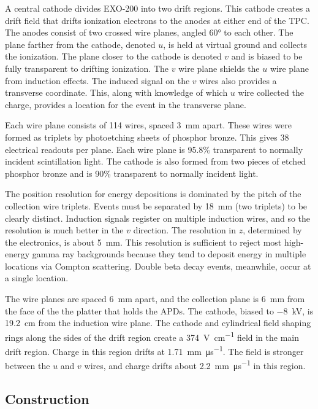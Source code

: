 \documentclass[herrin-thesis.tex]{subfiles}
\begin{document}
A central cathode divides EXO-200 into two drift regions. This cathode creates a drift field that drifts ionization electrons to the anodes at either end of the TPC. The anodes consist of two crossed wire planes, angled \ang{60} to each other. The plane farther from the cathode, denoted \(u\), is held at virtual ground and collects the ionization. The plane closer to the cathode is denoted \(v\) and is biased to be fully transparent to drifting ionization. The \(v\) wire plane shields the \(u\) wire plane from induction effects. The induced signal on the \(v\) wires also provides a transverse coordinate. This, along with knowledge of which \(u\) wire collected the charge, provides a location for the event in the transverse plane.

Each wire plane consists of 114 wires, spaced \SI{3}{\mm} apart. These wires were formed as triplets by photoetching sheets of phosphor bronze. This gives 38 electrical readouts per plane. Each wire plane is 95.8\% transparent to normally incident scintillation light. The cathode is also formed from two pieces of etched phosphor bronze and is 90\% transparent to normally incident light.

The position resolution for energy depositions is dominated by the pitch of the collection wire triplets. Events must be separated by \SI{18}{\mm} (two triplets) to be clearly distinct. Induction signals register on multiple induction wires, and so the resolution is much better in the \(v\) direction. The resolution in \(z\), determined by the electronics, is about \SI{5}{\mm}. This resolution is sufficient to reject most high-energy gamma ray backgrounds because they tend to deposit energy in multiple locations via Compton scattering. Double beta decay events, meanwhile, occur at a single location.

The wire planes are spaced \SI{6}{\mm} apart, and the collection plane is \SI{6}{\mm} from the face of the the platter that holds the APDs. The cathode, biased to \SI{-8}{\kV}, is \SI{19.2}{\cm} from the induction wire plane. The cathode and cylindrical field shaping rings along the sides of the drift region create a \SI{374}{\V\per\cm} field in the main drift region. Charge in this region drifts at \SI{1.71}{\mm\per\micro\s}. The field is stronger between the \(u\) and \(v\) wires, and charge drifts about \SI{2.2}{\mm\per\micro\s} in this region.

\subsection{Construction}
\end{document}
